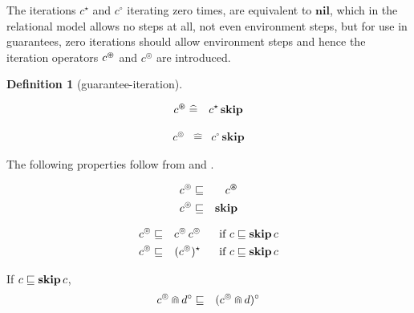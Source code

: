 \documentclass[fleqn]{fac}
\newtheorem{definition}{Definition}
\newcommand{\labelproperty}[1]{\label{property-#1}\index{Property!#1|PropertyDef{\ref{property-#1}}}}
\newcommand{\SSeq}{\,}
\newcommand{\FinSkipIter}{^{\varoast}}
\newcommand{\omegaskip}{\circledcirc}
\newcommand{\InfSkipIter}{^{\omegaskip}}
\newcommand{\Nil}{\Keyword{nil}}
\newcommand{\sdefs}{\mathrel{\widehat=}}\newcommand{\spot}{\mathrel{{\cdot}}}\newcommand{\where}{\mathrel{|}}\renewcommand{\implies}{\mathrel{\Rightarrow}}\newcommand{\emptyrel}{\emptyset}
\newcommand{\together}{\mathbin{\doublecap}}
\newcommand{\Keyword}[1]{\mathsf{\mathbf{#1}}}
\newcommand{\FinIter}{^{\star}}
\newcommand{\FinOrInfIter}{^{\circ}}
\newcommand{\Skip}{\Keyword{skip}}
\begin{document}
The iterations $c\FinIter$ and $c\FinOrInfIter$ iterating zero times, are equivalent to $\Nil$,
which in the relational model allows no steps at all, not even environment steps,
but for use in guarantees, zero iterations should allow environment steps and hence
the iteration operators $c\FinSkipIter$ and $c\InfSkipIter$ are introduced.
\begin{definition}[guarantee-iteration]\mbox{}\vspace*{-1ex}\\
\begin{minipage}{0.5\textwidth}
\begin{eqnarray}
  c\FinSkipIter & \sdefs & c\FinIter \SSeq \Skip
\end{eqnarray}
\end{minipage}
\begin{minipage}{0.495\textwidth}
\begin{eqnarray}
  c\InfSkipIter & \sdefs & c\FinOrInfIter \SSeq \Skip
\end{eqnarray}
\end{minipage}
\end{definition}
\begin{lemmax}[iteration] 
The following properties follow from  and .
\vspace*{-2ex}\\
\begin{minipage}[t]{0.5\textwidth}
\begin{eqnarray}
  c\InfSkipIter & \refsto & c\FinSkipIter \labelproperty{omega-to-kleene} \\
  c\InfSkipIter & \refsto & \Skip  \labelproperty{omega-skip} 
\end{eqnarray}
\end{minipage}
\begin{minipage}[t]{0.495\textwidth}
\begin{eqnarray}
  c\InfSkipIter & \refsto & c\InfSkipIter \SSeq c\InfSkipIter ~~~~~\mbox{if $c \refsto \Skip \SSeq c$}   \labelproperty{sequential-refines-omega} \\
  c\InfSkipIter & \refsto & (c\InfSkipIter)\FinIter                    ~~~~~\mbox{if $c \refsto \Skip \SSeq c$} \labelproperty{omega-refsto-omega-kleene}
\end{eqnarray}
\end{minipage}
\end{lemmax}


\begin{lawx}
If $c \refsto \Skip \SSeq c$,
\begin{eqnarray}
  c\InfSkipIter \together d\FinOrInfIter & \refsto & (c\InfSkipIter \together d)\FinOrInfIter 
    \labelproperty{conjunction-distribute-omega-omega}
\end{eqnarray}
\end{lawx}
\end{document}
